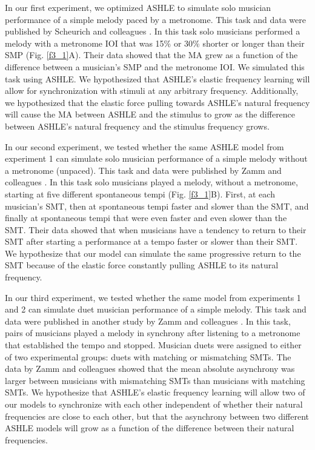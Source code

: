 \documentclass{report}
\begin{document}
In our first experiment, we optimized ASHLE to simulate solo musician performance of a simple melody paced by a metronome. This task and data were published by Scheurich and colleagues \cite{scheurich2018tapping}. In this task solo musicians performed a melody with a metronome IOI that was 15\% or 30\% shorter or longer than their SMP (Fig.{} \ref{f3_1}A). Their data showed that the MA grew as a function of the difference between a musician's SMP and the metronome IOI. We simulated this task using ASHLE. We hypothesized that ASHLE's elastic frequency learning will allow for synchronization with stimuli at any arbitrary frequency. Additionally, we hypothesized that the elastic force pulling towards ASHLE's natural frequency will cause the MA between ASHLE and the stimulus to grow as the difference between ASHLE's natural frequency and the stimulus frequency grows.

In our second experiment, we tested whether the same ASHLE model from experiment 1 can simulate solo musician performance of a simple melody without a metronome (unpaced). This task and data were published by Zamm and colleagues \cite{zamm2018musicians}. In this task solo musicians played a melody, without a metronome, starting at five different spontaneous tempi (Fig.{} \ref{f3_1}B). First, at each musician's SMT, then at spontaneous tempi faster and slower than the SMT, and finally at spontaneous tempi that were even faster and even slower than the SMT. Their data showed that when musicians have a tendency to return to their SMT after starting a performance at a tempo faster or slower than their SMT. We hypothesize that our model can simulate the same progressive return to the SMT because of the elastic force constantly pulling ASHLE to its natural frequency. 

In our third experiment, we tested whether the same model from experiments 1 and 2 can simulate duet musician performance of a simple melody. This task and data were published in another study by Zamm and colleagues \cite{zamm2016endogenous}. In this task, pairs of musicians played a melody in synchrony after listening to a metronome that established the tempo and stopped. Musician duets were assigned to either of two experimental groups: duets with matching or mismatching SMTs. The data by Zamm and colleagues \cite{zamm2016endogenous} showed that the mean absolute asynchrony was larger between musicians with mismatching SMTs than musicians with matching SMTs. We hypothesize that ASHLE's elastic frequency learning will allow two of our models to synchronize with each other independent of whether their natural frequencies are close to each other, but that the asynchrony between two different ASHLE models will grow as a function of the difference between their natural frequencies.
\end{document}
